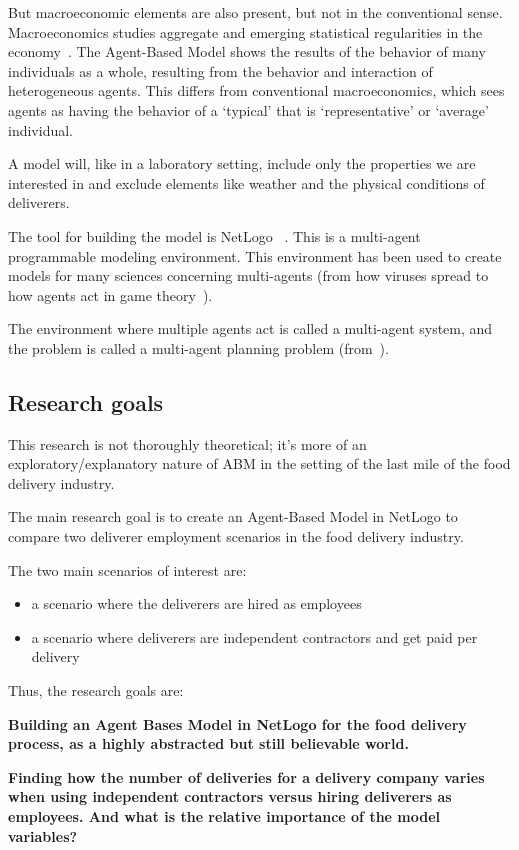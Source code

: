 But macroeconomic elements are also present, but not in the conventional sense.
Macroeconomics studies aggregate and emerging statistical regularities in the economy~\cite{cincotti2022we}.
The Agent-Based Model shows the results of the behavior of many individuals as a whole, resulting from the behavior and interaction of heterogeneous agents.
This differs from conventional macroeconomics, which sees agents as having the behavior of a `typical' that is `representative' or `average' individual.

A model will, like in a laboratory setting, include only the properties we are interested in and exclude elements like weather and the physical conditions of deliverers.

The tool for building the model is NetLogo ~\cite{NetLogo2024}.
This is a multi-agent programmable modeling environment.
This environment has been used to create models for many sciences concerning multi-agents (from how viruses spread to how agents act in game theory~\cite{r2019agent}).

The environment where multiple agents act is called a multi-agent system, and the problem is called a multi-agent planning problem (from~\cite{russell2016artificial}).

\subsection{Research goals}\label{subsec:research-goals}
This research is not thoroughly theoretical; it's more of an exploratory/explanatory nature of ABM in the setting of the last mile of the food delivery industry.

The main research goal is to create an Agent-Based Model in NetLogo to compare two deliverer employment scenarios in the food delivery industry.

The two main scenarios of interest are:
\begin{itemize}
    \item a scenario where the deliverers are hired as employees
    \item a scenario where deliverers are independent contractors and get paid per delivery
\end{itemize}

Thus, the research goals are:

\textbf{Building an Agent Bases Model in NetLogo for the food delivery process, as a highly abstracted but still believable world.}

\textbf{Finding how the number of deliveries for a delivery company varies when using independent contractors versus hiring deliverers as employees.
 And what is the relative importance of the model variables?}


